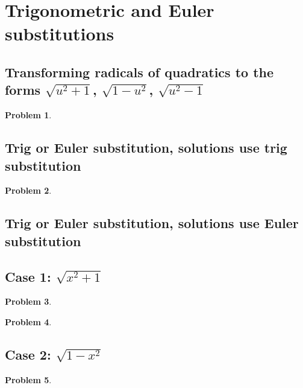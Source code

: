 \documentclass{article}
\newtheorem{problem}{Problem}
\begin{document}
\section{Trigonometric and Euler substitutions}
\subsection{Transforming radicals of quadratics to the forms $\sqrt{u^2+1}$, $\sqrt{1-u^2}$, $\sqrt{u^2-1}$}
\begin{problem}

\end{problem}


\subsection{Trig or Euler substitution, solutions use trig substitution}

\begin{problem}

\end{problem}


\subsection{Trig or Euler substitution, solutions use Euler substitution}
\subsection{Case 1: $\sqrt{x^2+1}$}

\begin{problem}

\end{problem}

\begin{problem}

\end{problem}
\subsection{Case 2: $\sqrt{1-x^2}$}
\begin{problem}

\end{problem}

\end{document}
